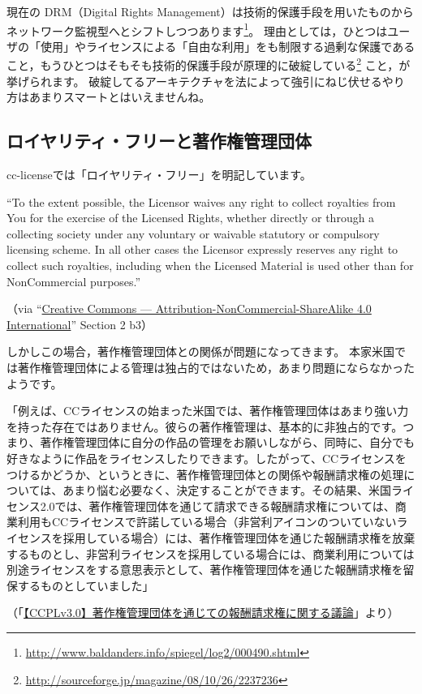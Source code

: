 \documentclass{ltjsarticle}
\begin{document}
現在の DRM（Digital Rights Management）は技術的保護手段を用いたものからネットワーク監視型へとシフトしつつあります\footnote{\url{http://www.baldanders.info/spiegel/log2/000490.shtml}}。
理由としては，ひとつはユーザの「使用」やライセンスによる「自由な利用」をも制限する過剰な保護であること，もうひとつはそもそも技術的保護手段が原理的に破綻している\footnote{\url{http://sourceforge.jp/magazine/08/10/26/2237236}} こと，が挙げられます。
破綻してるアーキテクチャを法によって強引にねじ伏せるやり方はあまりスマートとはいえませんね。


\subsection{ロイヤリティ・フリーと著作権管理団体}

cc-licenseでは「ロイヤリティ・フリー」を明記しています。
\begin{mdframed}
``To the extent possible, the Licensor waives any right to collect royalties from You for the exercise of the Licensed Rights, whether directly or through a collecting society under any voluntary or waivable statutory or compulsory licensing scheme. In all other cases the Licensor expressly reserves any right to collect such royalties, including when the Licensed Material is used other than for NonCommercial purposes.'' \par
（via ``\href{http://creativecommons.org/licenses/by-nc-sa/4.0/legalcode}{Creative Commons — Attribution-NonCommercial-ShareAlike 4.0 International}'' Section 2 b3）
\end{mdframed}
しかしこの場合，著作権管理団体との関係が問題になってきます。
本家米国では著作権管理団体による管理は独占的ではないため，あまり問題にならなかったようです。
\begin{mdframed}
「例えば、CCライセンスの始まった米国では、著作権管理団体はあまり強い力を持った存在ではありません。彼らの著作権管理は、基本的に非独占的です。つまり、著作権管理団体に自分の作品の管理をお願いしながら、同時に、自分でも好きなように作品をライセンスしたりできます。したがって、CCライセンスをつけるかどうか、というときに、著作権管理団体との関係や報酬請求権の処理については、あまり悩む必要なく、決定することができます。その結果、米国ライセンス2.0では、著作権管理団体を通じて請求できる報酬請求権については、商業利用もCCライセンスで許諾している場合（非営利アイコンのついていないライセンスを採用している場合）には、著作権管理団体を通じた報酬請求権を放棄するものとし、非営利ライセンスを採用している場合には、商業利用については別途ライセンスをする意思表示として、著作権管理団体を通じた報酬請求権を留保するものとしていました」\par
（「\href{http://creativecommons.jp/weblog/2006/11/1930/}{【CCPLv3.0】著作権管理団体を通じての報酬請求権に関する議論}」より）
\end{mdframed}
\end{document}
